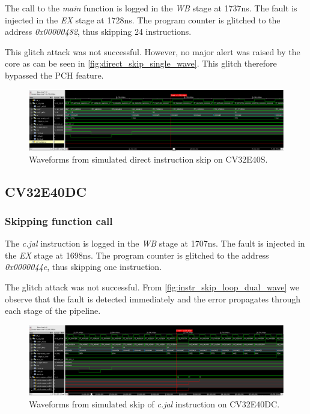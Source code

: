 The call to the \textit{main} function is logged in the \textit{WB} stage at 1737ns. The fault is injected in the \textit{EX} stage at 1728ns. The program counter is glitched to the address \textit{0x00000482}, thus skipping 24 instructions.

This glitch attack was not successful. However, no major alert was raised by the core as can be seen in \autoref{fig:direct_skip_single_wave}. This glitch therefore bypassed the PCH feature. 

\begin{figure}[h!]
    \centering
    \includegraphics[width=\textwidth]{docs/images/direct_skip_single_core.png}
    \caption{Waveforms from simulated direct instruction skip on CV32E40S.}
    \label{fig:direct_skip_single_wave}
\end{figure}

\subsection{CV32E40DC}
\label{subsec:dual_instr_skip}

\subsubsection{Skipping function call}

The \textit{c.jal} instruction is logged in the \textit{WB} stage at 1707ns. The fault is injected in the \textit{EX} stage at 1698ns. The program counter is glitched to the address \textit{0x0000044e}, thus skipping one instruction. 

The glitch attack was not successful. From \autoref{fig:instr_skip_loop_dual_wave} we observe that the fault is detected immediately and the error propagates through each stage of the pipeline. 

\begin{figure}[h!]
    \centering
    \includegraphics[width=\textwidth]{docs/images/instr_skip_dual_core.png}
    \caption{Waveforms from simulated skip of \textit{c.jal} instruction on CV32E40DC.}
    \label{fig:instr_skip_dual_wave}
\end{figure}


